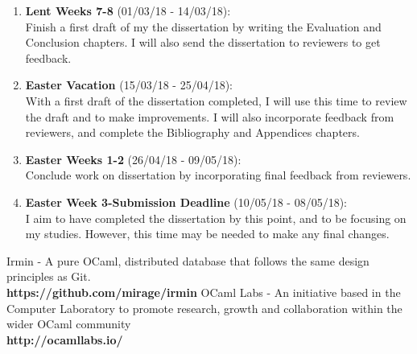 \documentclass[12pt, letterpaper, twoside]{article}
\begin{document}
\begin{enumerate}
		\item \textbf{Lent Weeks 7-8} (01/03/18 - 14/03/18):\\
		Finish a first draft of my the dissertation by writing the Evaluation and Conclusion chapters. I will also send the dissertation to reviewers to get feedback.
		\item \textbf{Easter Vacation} (15/03/18 - 25/04/18):\\
		With a first draft of the dissertation completed, I will use this time to review the draft and to make improvements. I will also incorporate feedback from reviewers, and complete the Bibliography and Appendices chapters.
		\item \textbf{Easter Weeks 1-2} (26/04/18 - 09/05/18):
		\\
		Conclude work on dissertation by incorporating final feedback from reviewers.
		\item \textbf{Easter Week 3-Submission Deadline} (10/05/18 - 08/05/18):\\
		I aim to have completed the dissertation by this point, and to be focusing on my studies. However, this time may be needed to make any final changes.
	\end{enumerate}
	\begin{thebibliography}{9}
		Irmin - A pure OCaml, distributed database that follows the same design principles as Git.\\ \textbf{https://github.com/mirage/irmin}
		OCaml Labs - An initiative based in the Computer Laboratory to promote research, growth and collaboration within the wider OCaml community\\
		\textbf{http://ocamllabs.io/}
		
	\end{thebibliography}
\end{document}
